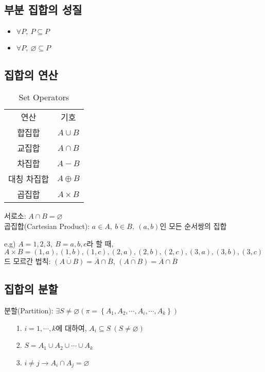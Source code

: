 \subsection{부분 집합의 성질}
\begin{itemize}
    \item $\forall P,\ P \subseteq P$
    \item $\forall P,\ \varnothing \subseteq P$
\end{itemize}
\subsection{집합의 연산}
\begin{table}[]
    \caption {Set Operators}
    \centering
    \begin{tabular}[1.5]{c|c}
    연산      & 기호\\
    \Xhline{3\arrayrulewidth}
    합집합  & $A \cup B$\\
    \hline
    교집합 & $A \cap B$\\
    \hline
    차집합 &$A-B$\\
    \hline
    대칭 차집합&$A\oplus B$\\
    \hline
    곱집합&$A\times B$
    \end{tabular}
\end{table}$$$$
서로소: $A \cap B = \varnothing$\\
곱집합(Cartesian Product): $a\in A,\ b \in B,\ (a, b)$인 모든 순서쌍의 집합

e.g) $A={1, 2, 3},\ B={a, b, c}$라 할 때, $A\times B = {(1, a), (1, b), (1, c), (2, a), (2, b), (2, c), (3, a), (3, b), (3, c)}$\\
드 모르간 법칙: $\overline{(A\cup B)} = \overline{A} \cap \overline{B}$, $\overline{(A \cap B)} = \overline{A} \cap \overline{B}$

\subsection{집합의 분할}
분할(Partition): $\exists S \neq \varnothing (\pi = \left\{A_1, A_2, \cdots, A_i, \cdots, A_k\right\})$
\begin{itemize}
    \item[1.] $i=1, \cdots, k$에 대하여, $A_i \subseteq S\ (S \neq \varnothing)$
    \item[2.] $S=A_1\cup A_2\cup \cdots \cup A_k$
    \item[3.] $i\neq j \to A_i \cap A_j = \varnothing$
\end{itemize}

